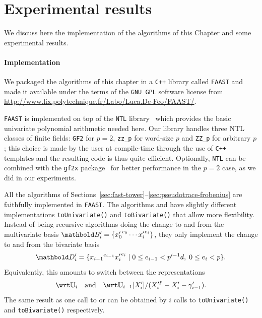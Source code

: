 

\section{Experimental results}
\label{sec:artin-benchmarks}

We discuss here the implementation of the algorithms of this Chapter
and some experimental results.

\paragraph{Implementation}
We packaged the algorithms of this chapter in a \texttt{C++} library
called \texttt{FAAST} and made it available under the terms of the
\texttt{GNU GPL} software license from \ifafive\\ \fi 
\url{http://www.lix.polytechnique.fr/Labo/Luca.De-Feo/FAAST/}.

\texttt{FAAST} is implemented on top of the \texttt{NTL}
library~\cite{shoup2003ntl} which provides the basic univariate
polynomial arithmetic needed here. Our library handles three NTL
classes of finite fields: \texttt{GF2} for $p=2$, \texttt{zz\_p} for
word-size $p$ and \texttt{ZZ\_p} for arbitrary $p$; this choice is made
by the user at compile-time through the use of \texttt{C++} templates
and the resulting code is thus quite efficient.  Optionally,
\texttt{NTL} can be combined with the \texttt{gf2x}
package~\cite{gf2x} for better performance in the $p=2$ case, as we
did in our experiments.

All the algorithms of
Sections~\ref{sec:fast-tower}--\ref{sec:pseudotrace-frobenius} are
faithfully implemented in \texttt{FAAST}. The algorithms
 and  have
slightly different implementations \texttt{toUnivariate()} and
\texttt{toBivariate()} that allow more flexibility. Instead of being
recursive algorithms doing the change to and from the multivariate
basis $\basis{B}'_i=\{{x_0'}^{e_0}\cdots {x_i'}^{e_i}\}$, they only
implement the change to and from the bivariate basis
\begin{equation}
  \label{eq:278}
  \basis{D}'_i=\{{x_{i-1}}^{e_{i-1}}{x_i'}^{e_i} \;|\;0\le
  e_{i-1}<p^{i-1}d,\; 0\le e_i<p\}
  \text{.}
\end{equation}
Equivalently, this amounts to
switch between the representations
\begin{equation}
  \wrt\U_i \quad\text{and}\quad
  \wrt\U_{i-1}[X_i']/({X_i'}^p-X_i'-\gamma_{i-1}')
  \text{.}
\end{equation}
The same result as one call to  or
 can be obtained by $i$ calls to
\texttt{toUnivariate()} and \texttt{toBivariate()} respectively.

